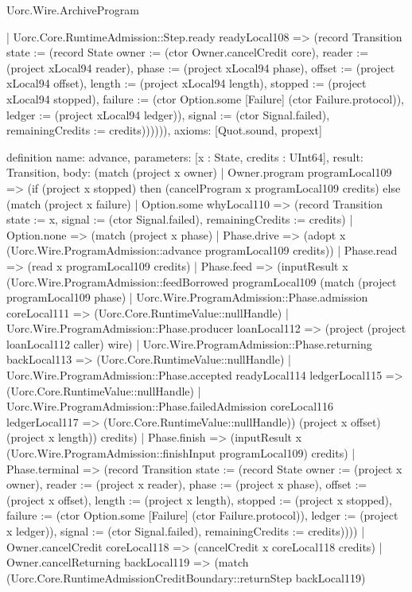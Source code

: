 \begin{lexlean}{Uorc.Wire.ArchiveProgram}
\begin{semanticmodule}
{        | Uorc.Core.RuntimeAdmission::Step.ready readyLocal108 => (record Transition {state := (record State {owner := (ctor Owner.cancelCredit core), reader := (project xLocal94 reader), phase := (project xLocal94 phase), offset := (project xLocal94 offset), length := (project xLocal94 length), stopped := (project xLocal94 stopped), failure := (ctor Option.some [Failure] (ctor Failure.protocol)), ledger := (project xLocal94 ledger)}), signal := (ctor Signal.failed), remainingCredits := credits})))))),
  axioms: [Quot.sound, propext]
}

definition{
  name: advance,
  parameters: [x : State, credits : UInt64],
  result: Transition,
  body: (match (project x owner)
    | Owner.program programLocal109 => (if (project x stopped) then (cancelProgram x programLocal109 credits) else (match (project x failure)
      | Option.some whyLocal110 => (record Transition {state := x, signal := (ctor Signal.failed), remainingCredits := credits})
      | Option.none => (match (project x phase)
        | Phase.drive => (adopt x (Uorc.Wire.ProgramAdmission::advance programLocal109 credits))
        | Phase.read => (read x programLocal109 credits)
        | Phase.feed => (inputResult x (Uorc.Wire.ProgramAdmission::feedBorrowed programLocal109 (match (project programLocal109 phase)
          | Uorc.Wire.ProgramAdmission::Phase.admission coreLocal111 => (Uorc.Core.RuntimeValue::nullHandle)
          | Uorc.Wire.ProgramAdmission::Phase.producer loanLocal112 => (project (project loanLocal112 caller) wire)
          | Uorc.Wire.ProgramAdmission::Phase.returning backLocal113 => (Uorc.Core.RuntimeValue::nullHandle)
          | Uorc.Wire.ProgramAdmission::Phase.accepted readyLocal114 ledgerLocal115 => (Uorc.Core.RuntimeValue::nullHandle)
          | Uorc.Wire.ProgramAdmission::Phase.failedAdmission coreLocal116 ledgerLocal117 => (Uorc.Core.RuntimeValue::nullHandle)) (project x offset) (project x length)) credits)
        | Phase.finish => (inputResult x (Uorc.Wire.ProgramAdmission::finishInput programLocal109) credits)
        | Phase.terminal => (record Transition {state := (record State {owner := (project x owner), reader := (project x reader), phase := (project x phase), offset := (project x offset), length := (project x length), stopped := (project x stopped), failure := (ctor Option.some [Failure] (ctor Failure.protocol)), ledger := (project x ledger)}), signal := (ctor Signal.failed), remainingCredits := credits}))))
    | Owner.cancelCredit coreLocal118 => (cancelCredit x coreLocal118 credits)
    | Owner.cancelReturning backLocal119 => (match (Uorc.Core.RuntimeAdmissionCreditBoundary::returnStep backLocal119)
}
\end{semanticmodule}
\end{lexlean}
